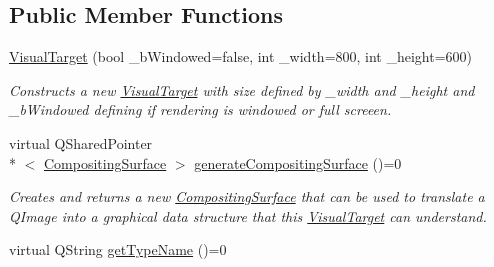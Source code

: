 \subsection*{Public Member Functions}
\begin{DoxyCompactItemize}
\item 
\hyperlink{class_picto_1_1_visual_target_a640b2cbbd611a280f97f88c29eef610a}{Visual\-Target} (bool \-\_\-b\-Windowed=false, int \-\_\-width=800, int \-\_\-height=600)
\begin{DoxyCompactList}\small\item\em Constructs a new \hyperlink{class_picto_1_1_visual_target}{Visual\-Target} with size defined by \-\_\-width and \-\_\-height and \-\_\-b\-Windowed defining if rendering is windowed or full screeen. \end{DoxyCompactList}\item 
virtual Q\-Shared\-Pointer\\*
$<$ \hyperlink{struct_picto_1_1_compositing_surface}{Compositing\-Surface} $>$ \hyperlink{class_picto_1_1_visual_target_ac4a01741b91fa6a984e18453d47b9da8}{generate\-Compositing\-Surface} ()=0
\begin{DoxyCompactList}\small\item\em Creates and returns a new \hyperlink{struct_picto_1_1_compositing_surface}{Compositing\-Surface} that can be used to translate a Q\-Image into a graphical data structure that this \hyperlink{class_picto_1_1_visual_target}{Visual\-Target} can understand. \end{DoxyCompactList}\item 
\hypertarget{class_picto_1_1_visual_target_aee02d88e9a79343ac5c1438f284b5d40}{virtual Q\-String \hyperlink{class_picto_1_1_visual_target_aee02d88e9a79343ac5c1438f284b5d40}{get\-Type\-Name} ()=0}\label{class_picto_1_1_visual_target_aee02d88e9a79343ac5c1438f284b5d40}


\end{DoxyCompactItemize}
